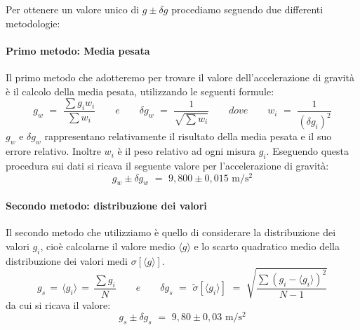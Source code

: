 Per ottenere un valore unico di $g \pm \delta g$ procediamo seguendo due differenti metodologie:

\paragraph{Primo metodo: Media pesata\\}

Il primo metodo che adotteremo per trovare il valore dell'accelerazione di gravità è il calcolo della media pesata, utilizzando le seguenti formule:
\begin{equation}
g_w \,\, = \,\, \frac{\sum g_iw_i}{\sum w_i} \quad\quad e \quad\quad \delta g_w \,\, = \,\, \frac{1}{\sqrt{\sum w_i}} \quad\quad dove \quad\quad w_i \,\, = \,\, \frac{1}{(\delta g_i)^2}
\end{equation}
%
$g_w$ e $\delta g_w$ rappresentano relativamente il risultato della media pesata e il suo errore relativo. Inoltre $w_i$ è il peso relativo ad ogni misura $g_i$.
Eseguendo questa procedura sui dati si ricava il seguente valore per l'accelerazione di gravità:
\begin{equation}
g_w \pm \delta g_w \,\, = \,\, 9,800 \pm 0,015 \,\, \si{\metre\per\square\second}
\end{equation}

\paragraph{Secondo metodo: distribuzione dei valori\\}

Il secondo metodo che utilizziamo è quello di considerare la distribuzione dei valori $g_i$, cioè calcolarne il valore medio $\langle g\rangle$ e lo scarto quadratico medio della distribuzione dei valori medi $\sigma[\langle g \rangle]$.
\begin{equation}
g_s \, = \, \langle g_i \rangle \, = \, \frac{\sum g_i}{N} \quad\quad e \quad\quad	\delta g_s \,\, = \,\, \tilde{\sigma}[\langle g_i \rangle] \,\, = \,\, \sqrt{\frac{\sum (g_i - \langle g_i \rangle)^2}{N-1}}
\end{equation}
%
da cui si ricava il valore:
\begin{equation}
g_s \pm \delta g_s \,\, = \,\, 9,80 \pm 0,03 \,\, \si{\metre\per\square\second}
\end{equation}

